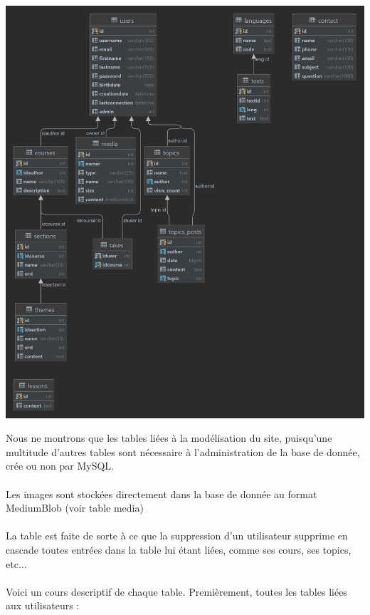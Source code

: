\documentclass[a4paper,11pt]{article}
\begin{document}
\centerline{
    \includegraphics[width=16cm]{images/DB.png}
}
Nous ne montrons que les tables liées à la modélisation du site, puisqu'une multitude d'autres tables sont nécessaire à l'administration de la base de donnée, crée ou non par MySQL.\\\\
Les images sont stockées directement dans la base de donnée au format MediumBlob (voir table media)\\\\
La table est faite de sorte à ce que la suppression d'un utilisateur supprime en cascade toutes entrées dans la table lui étant liées, comme ses cours, ses topics, etc...\\\\
Voici un cours descriptif de chaque table. Premièrement, toutes les tables liées aux utilisateurs :
\end{document}

